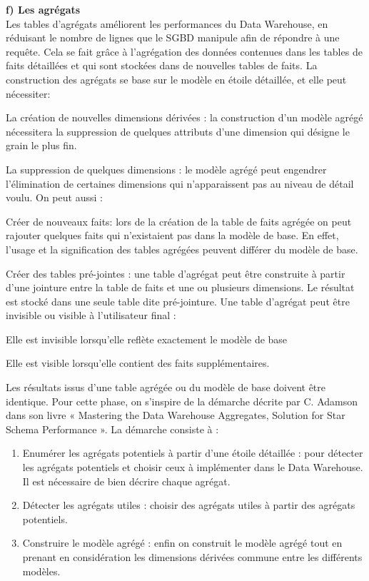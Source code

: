 \textbf{f) Les agrégats}\\
Les tables d’agrégats améliorent les performances du Data Warehouse, en réduisant le nombre de lignes que le SGBD manipule afin de répondre à une requête. Cela se fait grâce à l’agrégation des données contenues dans les tables de faits détaillées et qui sont stockées dans de nouvelles tables de faits.
La construction des agrégats se base sur le modèle en étoile détaillée, et elle peut nécessiter:
\begin{list}{•}{ }
   \item La création de nouvelles dimensions dérivées : la construction d’un modèle agrégé nécessitera la suppression de quelques attributs d’une dimension qui désigne le grain le plus fin.
   \item La suppression de quelques dimensions : le modèle agrégé peut engendrer l’élimination de certaines dimensions qui n’apparaissent pas au niveau de détail voulu. On peut aussi :
   \item Créer de nouveaux faits: lors de la création de la table de faits agrégée on peut rajouter quelques faits qui n’existaient pas dans la modèle de base. En effet, l’usage et la signification des tables agrégées peuvent différer du modèle de base.
   \item  Créer des tables pré-jointes : une table d’agrégat peut être construite à partir d’une jointure entre la table de faits et une ou plusieurs dimensions. Le résultat est stocké dans une seule table dite pré-jointure. Une table d’agrégat peut être invisible ou visible à l’utilisateur final :
 \begin{list}{-}{ }
       \item Elle est invisible lorsqu’elle reflète exactement le modèle de base
       \item Elle est visible lorsqu’elle contient des faits supplémentaires.
 \end{list}
Les résultats issus d’une table agrégée ou du modèle de base doivent être identique.
Pour cette phase, on s’inspire de la démarche décrite par C. Adamson dans son livre
« Mastering the Data Warehouse Aggregates, Solution for Star Schema Performance ». La démarche consiste à :
\begin{enumerate}
 \item Enumérer les agrégats potentiels à partir d’une étoile détaillée : pour détecter les agrégats potentiels et choisir ceux à implémenter dans le Data Warehouse. Il est nécessaire de bien décrire chaque agrégat.
  \item Détecter les agrégats utiles : choisir des agrégats utiles à partir des agrégats potentiels.
  \item Construire le modèle agrégé : enfin on construit le modèle agrégé tout en prenant en considération les dimensions dérivées commune entre les différents modèles.
\end{enumerate}
\end{list}

